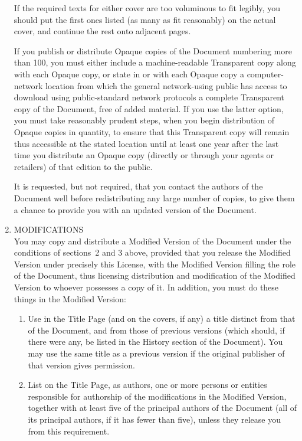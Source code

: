 \begin{enumerate}
  If the required texts for either cover are too voluminous to fit
  legibly, you should put the first ones listed (as many as fit
  reasonably) on the actual cover, and continue the rest onto adjacent
  pages.

  If you publish or distribute Opaque copies of the Document numbering
  more than 100, you must either include a machine-readable
  Transparent copy along with each Opaque copy, or state in or with
  each Opaque copy a computer-network location from which the general
  network-using public has access to download using public-standard
  network protocols a complete Transparent copy of the Document, free
  of added material.  If you use the latter option, you must take
  reasonably prudent steps, when you begin distribution of Opaque
  copies in quantity, to ensure that this Transparent copy will remain
  thus accessible at the stated location until at least one year after
  the last time you distribute an Opaque copy (directly or through
  your agents or retailers) of that edition to the public.

  It is requested, but not required, that you contact the authors of
  the Document well before redistributing any large number of copies,
  to give them a chance to provide you with an updated version of the
  Document.

\item MODIFICATIONS \\
  You may copy and distribute a Modified Version of the Document under
  the conditions of sections~2 and 3 above, provided that you release
  the Modified Version under precisely this License, with the Modified
  Version filling the role of the Document, thus licensing
  distribution and modification of the Modified Version to whoever
  possesses a copy of it.  In addition, you must do these things in
  the Modified Version:

  \begin{enumerate}\renewcommand{\labelenumii}{\Alph{enumii}.}
  \item
    Use in the Title Page (and on the covers, if any) a title distinct
    from that of the Document, and from those of previous versions
    (which should, if there were any, be listed in the History section
    of the Document).  You may use the same title as a previous
    version if the original publisher of that version gives
    permission.

  \item
    List on the Title Page, as authors, one or more persons or
    entities responsible for authorship of the modifications in the
    Modified Version, together with at least five of the principal
    authors of the Document (all of its principal authors, if it has
    fewer than five), unless they release you from this requirement.


\end{enumerate}
\end{enumerate}
